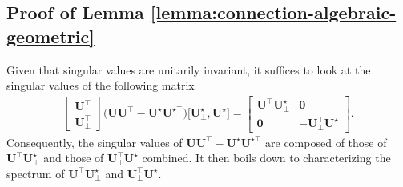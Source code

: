 \subsection{Proof of Lemma \ref{lemma:connection-algebraic-geometric}}
Given that singular values are unitarily invariant, it suffices to look at
the singular values of the following matrix
%
\begin{align}
\left[\begin{array}{c}
\bm{U}^{\top}\\
\bm{U}_{\perp}^{\top}
\end{array}\right]\big(\bm{U}\bm{U}^{\top}- {\bm{U}}^{\star} {\bm{U}}^{\star\top}\big)
	\big[
{\bm{U}}_{\perp}^{\star} , {\bm{U}}^{\star} \big]=\left[\begin{array}{cc}
	\bm{U}^{\top}{\bm{U}}_{\perp}^{\star} & \bm{0}\\
\bm{0} & -\bm{U}_{\perp}^{\top} {\bm{U}}^{\star}
\end{array}\right].
	\label{eq:transform-UU-UU}
\end{align}
%
Consequently, the singular values of $\bm{U}\bm{U}^{\top}- {\bm{U}}^{\star} {\bm{U}}^{\star\top}$
are composed of those of $\bm{U}^{\top}{\bm{U}}_{\perp}^{\star}$ and those of
$\bm{U}_{\perp}^{\top} {\bm{U}}^{\star}$ combined. It then boils down to characterizing the spectrum of $\bm{U}^{\top}{\bm{U}}_{\perp}^{\star}$ and $\bm{U}_{\perp}^{\top} {\bm{U}}^{\star}$.

